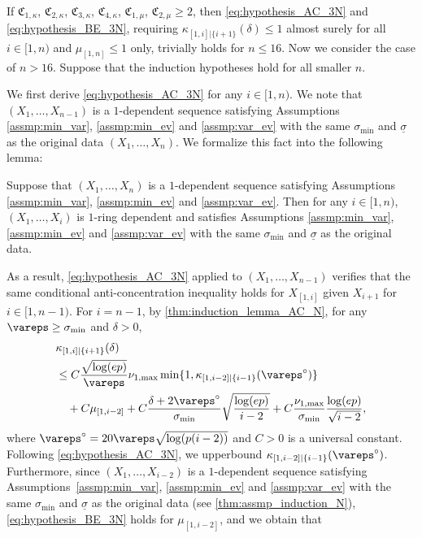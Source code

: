 \documentclass[aos]{imsart}
\begin{document}
If $\mathfrak{C}_{1,\kappa}$, $\mathfrak{C}_{2,\kappa}$, $\mathfrak{C}_{3,\kappa}$, $\mathfrak{C}_{4,\kappa}$, $\mathfrak{C}_{1,\mu}$, $\mathfrak{C}_{2,\mu} \geq 2$, then \eqref{eq:hypothesis_AC_3N} and \eqref{eq:hypothesis_BE_3N}, requiring $\kappa_{[1,i]|\{i+1\}}(\delta) \leq 1$ almost surely for all $i \in [1, n)$ and $\mu_{[1,n]} \leq 1$ only, trivially holds for $n \leq 16$. Now we consider the case of $n > 16$. Suppose that the induction hypotheses hold for all smaller $n$.

\medskip
We first derive \eqref{eq:hypothesis_AC_3N} for any $i \in [1,n)$. We note that $(X_1, \dots, X_{n-1})$ is a $1$-dependent sequence satisfying Assumptions \eqref{assmp:min_var}, \eqref{assmp:min_ev} and \eqref{assmp:var_ev} with the same $\sigma_{\min}$ and $\underline{\sigma}$ as the original data $(X_1, \dots, X_n)$. We formalize this fact into the following lemma:
\begin{lemma} \label{thm:assmp_induction_N}
    Suppose that $(X_1, \dots, X_n)$ is a $1$-dependent sequence satisfying Assumptions \eqref{assmp:min_var}, \eqref{assmp:min_ev} and \eqref{assmp:var_ev}. Then for any $i \in [1,n)$, $(X_{1}, \dots, X_{i})$ is $1$-ring dependent and satisfies Assumptions \eqref{assmp:min_var}, \eqref{assmp:min_ev} and \eqref{assmp:var_ev} with the same $\sigma_{\min}$ and $\underline{\sigma}$ as the original data.
\end{lemma}
As a result, \eqref{eq:hypothesis_AC_3N} applied to $(X_1, \dots, X_{n-1})$ verifies that the same conditional anti-concentration inequality holds for $X_{[1,i]}$ given $X_{i+1}$ for $ i \in [1,n-1)$. For $i = n-1$, by \cref{thm:induction_lemma_AC_N}, 
for any $\vareps \geq \sigma_{\min}$ and $\delta > 0$,
\begin{equation*} %
\begin{aligned}
    & \kappa_{[1,i]|\{i+1\}}(\delta) \\
    & \leq C
    \frac{\sqrt{\log(ep)}}{\vareps} \nu_{1,\max} 
    \min\{1, \kappa_{[1,i-2]|\{i-1\}}(\vareps^\circ)\} \\
    & \quad + C \mu_{[1,i-2]}
    + C\frac{\delta + 2\vareps^\circ}{\sigma_{\min}} \sqrt{\frac{\log(ep)}{i-2}}
    + C\frac{\nu_{1,\max}}{\sigma_{\min}} \frac{\log(ep)}{\sqrt{i-2}},
\end{aligned}
\end{equation*}
where $\vareps^\circ = 20\vareps \sqrt{\log(p(i-2))}$ and $C > 0$ is a universal constant. Following \eqref{eq:hypothesis_AC_3N}, we upperbound $\kappa_{[1,i-2]|\{i-1\}}(\vareps^\circ)$. Furthermore, since $(X_1, \dots, X_{i-2})$ is a $1$-dependent sequence satisfying Assumptions~\eqref{assmp:min_var}, \eqref{assmp:min_ev} and \eqref{assmp:var_ev} with the same $\sigma_{\min}$ and $\underline{\sigma}$ as the original data (see \cref{thm:assmp_induction_N}), \eqref{eq:hypothesis_BE_3N} holds for $\mu_{[1,i-2]}$, and we obtain that
\end{document}
